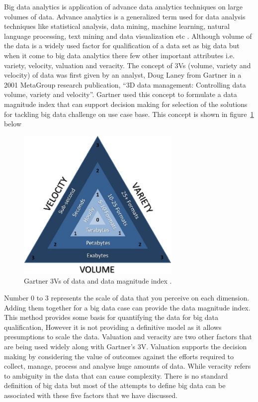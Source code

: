 Big data analytics is application of advance data analytics techniques on large volumes of data. Advance analytics is a generalized term used for data analysis techniques like statistical analysis, data mining, machine learning, natural language processing, text mining and data visualization etc \cite{russom2011big}. Although volume of the data is a widely used factor for qualification of a data set as big data but when it come to big data analytics there few other important attributes i.e. variety, velocity, valuation and veracity. The concept of 3Vs (volume, variety and velocity) of data was first given by an analyst, Doug Laney from Gartner  in a 2001 MetaGroup research publication, ``3D data management: Controlling data volume, variety and velocity''\cite{laney20013d}.  Gartner used this concept to formulate a data magnitude index that can support decision making for selection of the solutions for tackling big data challenge on use case base. This concept is shown in figure~\ref{fig:3Vs} below

\begin{figure}[ht]
  \begin{center}
    \includegraphics[width=0.7\textwidth]{images/3Vs.png}
    \caption{Gartner 3Vs of data and data magnitude index \cite{laney20013d}.}
    \label{fig:3Vs}
  \end{center}
\end{figure}

Number 0 to 3 represents the scale of data that you perceive on each dimension. Adding them together for a big data case can provide the data magnitude index. This method provides some basis for quantifying the data for big data qualification, However it is not providing a definitive model as it allows presumptions to scale the data. Valuation and veracity are two other factors that are being used widely along with Gartner's 3V. Valuation supports the decision making by considering the value of outcomes against the efforts required to collect, manage, process and analyse huge amounts of data.  While veracity refers to ambiguity in the data that can cause complexity. There is no standard definition of big data but most of the attempts to define big data can be associated with these five factors that we have discussed.

